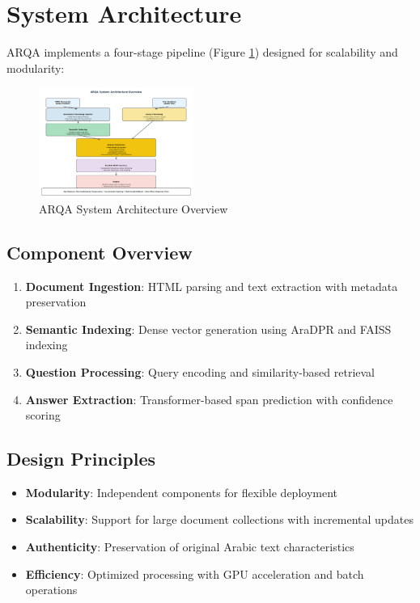 \documentclass[conference]{IEEEtran}
\begin{document}
\section{System Architecture}

ARQA implements a four-stage pipeline (Figure \ref{fig:architecture}) designed for scalability and modularity:

\begin{figure}[htbp]
\centerline{\includegraphics[width=0.45\textwidth]{arqa_architecture.png}}
\caption{ARQA System Architecture Overview}
\label{fig:architecture}
\end{figure}

\subsection{Component Overview}
\begin{enumerate}
    \item \textbf{Document Ingestion}: HTML parsing and text extraction with metadata preservation
    \item \textbf{Semantic Indexing}: Dense vector generation using AraDPR and FAISS indexing
    \item \textbf{Question Processing}: Query encoding and similarity-based retrieval
    \item \textbf{Answer Extraction}: Transformer-based span prediction with confidence scoring
\end{enumerate}

\subsection{Design Principles}
\begin{itemize}
    \item \textbf{Modularity}: Independent components for flexible deployment
    \item \textbf{Scalability}: Support for large document collections with incremental updates
    \item \textbf{Authenticity}: Preservation of original Arabic text characteristics
    \item \textbf{Efficiency}: Optimized processing with GPU acceleration and batch operations
\end{itemize}
\end{document}
